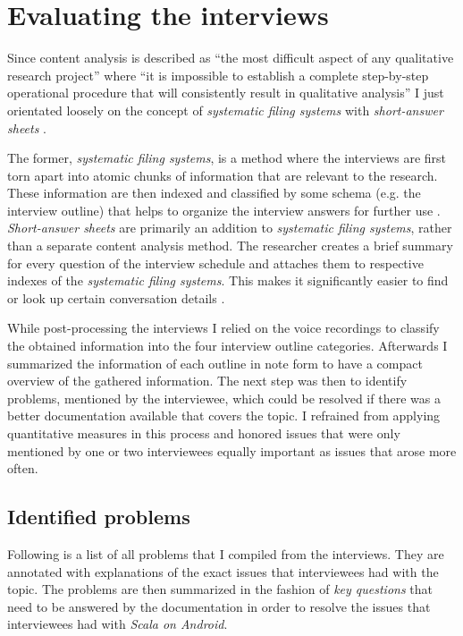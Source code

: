 \section{Evaluating the interviews}

Since content analysis is described as \enquote{the most difficult aspect of any qualitative research project} where \enquote{it is impossible to establish a complete step-by-step operational procedure that will consistently result in qualitative analysis} \cite[p. 102]{berg01} I just orientated loosely on the concept of \textit{systematic filing systems} \cite[p. 103]{berg01} with \textit{short-answer sheets} \cite[p. 105]{berg01}.

The former, \textit{systematic filing systems}, is a method where the interviews are first torn apart into atomic chunks of information that are relevant to the research. These information are then indexed and classified by some schema (e.g. the interview outline) that helps to organize the interview answers for further use \cite[p. 103]{berg01}. \textit{Short-answer sheets} are primarily an addition to \textit{systematic filing systems}, rather than a separate content analysis method. The researcher creates a brief summary for every question of the interview schedule and attaches them to respective indexes of the \textit{systematic filing systems}. This makes it significantly easier to find or look up certain conversation details \cite[p. 105]{berg01}.

While post-processing the interviews I relied on the voice recordings to classify the obtained information into the four interview outline categories. Afterwards I summarized the information of each outline in note form to have a compact overview of the gathered information. The next step was then to identify problems, mentioned by the interviewee, which could be resolved if there was a better documentation available that covers the topic. I refrained from applying quantitative measures in this process and honored issues that were only mentioned by one or two interviewees equally important as issues that arose more often.

\subsection{Identified problems}

Following is a list of all problems that I compiled from the interviews. They are annotated with explanations of the exact issues that interviewees had with the topic. The problems are then summarized in the fashion of \textit{key questions} that need to be answered by the documentation in order to resolve the issues that interviewees had with \textit{Scala on Android}.

